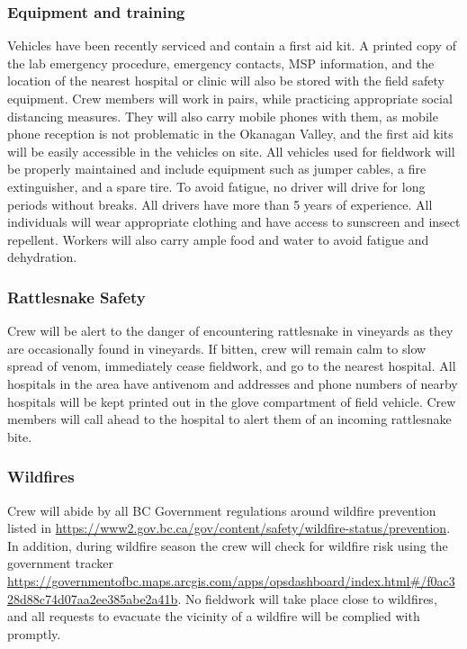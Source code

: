 \documentclass[11pt,letter]{article}
\begin{document}
\subsubsection{Equipment and training}
Vehicles have been recently serviced and contain a first aid kit. A printed copy of the lab emergency procedure, emergency contacts, MSP information, and the location of the nearest hospital or clinic will also be stored with the field safety equipment. Crew members will work in pairs, while practicing appropriate social distancing measures. They will also carry mobile phones with them, as mobile phone reception is not problematic in the Okanagan Valley, and the first aid kits will be easily accessible in the vehicles on site. All vehicles used for fieldwork will be properly maintained and include equipment such as jumper cables, a fire extinguisher, and a spare tire. To avoid fatigue, no driver will drive for long periods without breaks. All drivers have more than 5 years of experience. All individuals will wear appropriate clothing and have access to sunscreen and insect repellent. Workers will also carry ample food and water to avoid fatigue and dehydration.  

\subsubsection{Rattlesnake Safety}
Crew will be alert to the danger of encountering rattlesnake in vineyards as they are occasionally found in vineyards. If bitten, crew will remain calm to slow spread of venom, immediately cease fieldwork, and go to the nearest hospital. All hospitals in the area have antivenom and addresses and phone numbers of nearby hospitals will be kept printed out in the glove compartment of field vehicle. Crew members will call ahead to the hospital to alert them of an incoming rattlesnake bite.

\subsubsection{Wildfires}
Crew will abide by all BC Government regulations around wildfire prevention listed in \url{https://www2.gov.bc.ca/gov/content/safety/wildfire-status/prevention}. In addition, during wildfire season the crew will check for wildfire risk using the government tracker  \url{https://governmentofbc.maps.arcgis.com/apps/opsdashboard/index.html#/f0ac328d88c74d07aa2ee385abe2a41b}. No fieldwork will take place close to wildfires, and all requests to evacuate the vicinity of a wildfire will be complied with promptly. 
\end{document}
